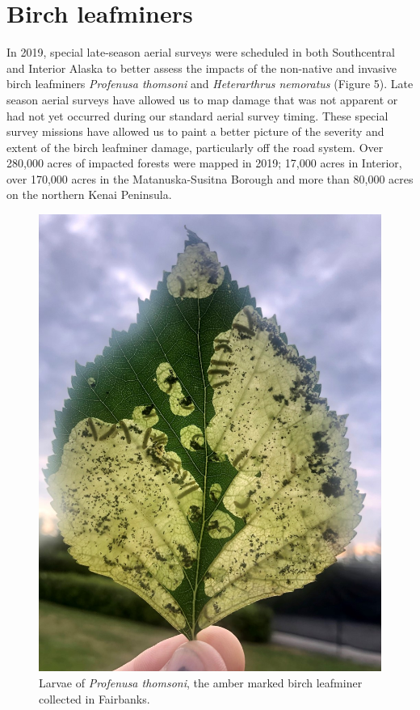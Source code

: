 \section{Birch leafminers}

In 2019, special late-season aerial surveys were scheduled in both Southcentral and Interior Alaska to better assess the impacts of the non-native and invasive birch leafminers \textit{Profenusa thomsoni} and \textit{Heterarthrus nemoratus} (Figure 5). Late season aerial surveys have allowed us to map damage that was not apparent or had not yet occurred during our standard aerial survey timing. These special survey missions have allowed us to paint a better picture of the severity and extent of the birch leafminer damage, particularly off the road system. Over 280,000 acres of impacted forests were mapped in 2019; 17,000 acres in Interior, over 170,000 acres in the Matanuska-Susitna Borough and more than 80,000 acres on the northern Kenai Peninsula. 

\begin{figure}[H]
\begin{center}
\includegraphics[width=\textwidth]{img/birch_leafminers.jpg}
\caption{Larvae of \textit{Profenusa thomsoni}, the amber marked birch leafminer collected in Fairbanks.}
\label{birch_leafminers}
\end{center}
\end{figure}  

